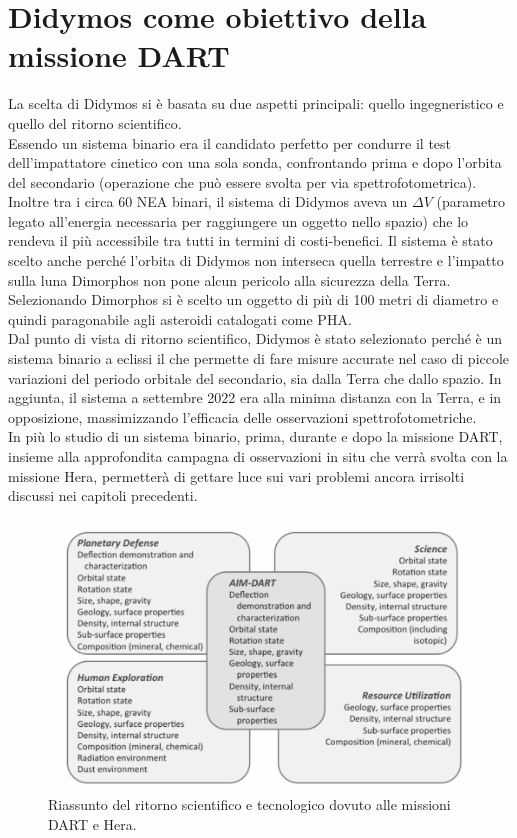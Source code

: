 \documentclass[a4paper,11pt,openright]{book}
\begin{document}
\section{Didymos come obiettivo della missione DART}
La scelta di Didymos si è basata su due aspetti principali: quello ingegneristico e quello del ritorno scientifico.\\
Essendo un sistema binario era il candidato perfetto per condurre il test dell'impattatore cinetico con una sola sonda, confrontando prima e dopo l'orbita del secondario (operazione che può essere svolta per via spettrofotometrica). Inoltre tra i circa 60 NEA binari, il sistema di Didymos aveva un $\Delta V$ (parametro legato all'energia necessaria per raggiungere un oggetto nello spazio) che lo rendeva il più accessibile tra tutti in termini di costi-benefici. Il sistema è stato scelto anche perché l'orbita di Didymos non interseca quella terrestre e l'impatto sulla luna Dimorphos non pone alcun pericolo alla sicurezza della Terra. Selezionando Dimorphos si è scelto un oggetto di più di 100 metri di diametro e quindi paragonabile agli asteroidi catalogati come PHA.\\
Dal punto di vista di ritorno scientifico, Didymos è stato selezionato perché è un sistema binario a eclissi il che permette di fare misure accurate nel caso di piccole variazioni del periodo orbitale del secondario, sia dalla Terra che dallo spazio. In aggiunta, il sistema a settembre 2022 era alla minima distanza con la Terra, e in opposizione, massimizzando l'efficacia delle osservazioni spettrofotometriche.\\
In più lo studio di un sistema binario, prima, durante e dopo la missione DART, insieme alla approfondita campagna di osservazioni in situ che verrà svolta con la missione Hera, permetterà di gettare luce sui vari problemi ancora irrisolti discussi nei capitoli precedenti.

\begin{figure}[!h]
    \centering
    \includegraphics[width=\textwidth]{figure/Michel et al.png}
    \caption[Riassunto del ritorno scientifico e tecnologico dovuto alle missioni DART e Hera.]{Riassunto del ritorno scientifico e tecnologico dovuto alle missioni DART e Hera. \citep{MICHEL20162529}}
    \label{fig:ritorno_scientifico}
\end{figure}
\end{document}
